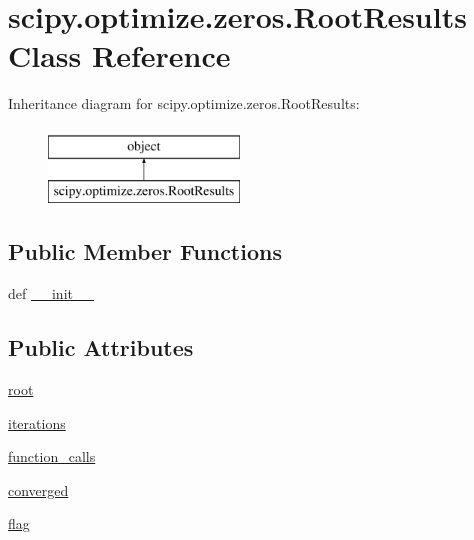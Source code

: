 \hypertarget{classscipy_1_1optimize_1_1zeros_1_1RootResults}{}\section{scipy.\+optimize.\+zeros.\+Root\+Results Class Reference}
\label{classscipy_1_1optimize_1_1zeros_1_1RootResults}
Inheritance diagram for scipy.\+optimize.\+zeros.\+Root\+Results\+:\begin{figure}[H]
\begin{center}
\leavevmode
\includegraphics[height=2.000000cm]{classscipy_1_1optimize_1_1zeros_1_1RootResults}
\end{center}
\end{figure}
\subsection*{Public Member Functions}
\begin{DoxyCompactItemize}
\item 
def \hyperlink{classscipy_1_1optimize_1_1zeros_1_1RootResults_a220ce9b418907808f78ac1507cfd7872}{\+\_\+\+\_\+init\+\_\+\+\_\+}
\end{DoxyCompactItemize}
\subsection*{Public Attributes}
\begin{DoxyCompactItemize}
\item 
\hyperlink{classscipy_1_1optimize_1_1zeros_1_1RootResults_aca9f4e0e84bff67734e8172525764027}{root}
\item 
\hyperlink{classscipy_1_1optimize_1_1zeros_1_1RootResults_ad1c8f70e9098a3cedcd046ef353efe3c}{iterations}
\item 
\hyperlink{classscipy_1_1optimize_1_1zeros_1_1RootResults_a1a1245c6e6c839caadbf97b77ae0717d}{function\+\_\+calls}
\item 
\hyperlink{classscipy_1_1optimize_1_1zeros_1_1RootResults_a6d49fd59f67894d71f48f4e126db217e}{converged}
\item 
\hyperlink{classscipy_1_1optimize_1_1zeros_1_1RootResults_aa337ced8db8cd7543823e6b7aabfbf36}{flag}
\end{DoxyCompactItemize}


